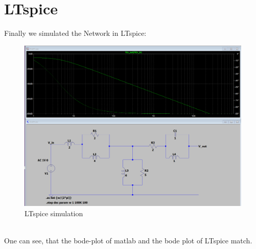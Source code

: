 \documentclass[a4paper]{article}
\begin{document}
\section{LTspice}
Finally we simulated the Network in LTspice:\\
\begin{figure}[ht] \centering
  \includegraphics[scale=0.5]{./../LTspice/Circuit.PNG}
  \caption{LTspice simulation}
\end{figure}\\
One can see, that the bode-plot of matlab and the bode plot of LTspice match.
\end{document}
